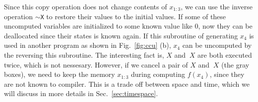 \documentclass[aps,twocolumn,longbibliography,english,superscriptaddress]{revtex4-1}
\newcommand{\<}{\langle}
\renewcommand{\>}{\rangle}
\newcommand{\Fig}[1]{Fig.~\ref{#1}}
\newcommand{\Sec}[1]{Sec.~\ref{#1}}
\theoremstyle{definition}\newtheorem{definition}{\textit{Definition}}
\begin{document}
Since this copy operation does not change contents of $x_{1\colon 3}$, we can use the inverse operation \texttt{$\sim$X} to restore their values to the initial values. If some of these uncomputed variables are initialized to some known value like $0$, now they can be deallocated since their states is known again.
If this subroutine of generating $x_4$ is used in another program as shown in \Fig{fig:ccu} (b), $x_4$ can be uncomputed by the reversing this subroutine.
The interesting fact is, $X$ and $~X$ are both executed twice, which is not nessesary. However, if we cancel a pair of $X$ and $~X$ (the gray boxes), we need to keep the memory $x_{1\colon3}$ during computing $f(x_4)$, since they are not known to compiler. This is a trade off between space and time, which we will discuss in more details in \Sec{sec:timespace}.
\end{document}
